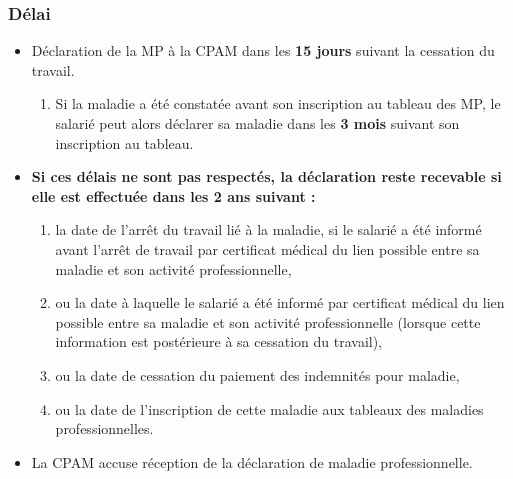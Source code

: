 \documentclass{beamer}
\begin{document}
\begin{frame}
\frametitle{Délai}

\begin{itemize}
\item Déclaration de la MP à la CPAM dans les \textbf{15 jours} suivant la cessation du travail. 
\begin{enumerate}
\item Si la maladie a été constatée avant son inscription au tableau des MP, le salarié peut alors déclarer sa maladie dans les \textbf{3 mois} suivant son inscription au tableau.
\end{enumerate}
\item \textbf{Si ces délais ne sont pas respectés, la déclaration reste recevable si elle est effectuée dans les 2 ans suivant :}
\begin{enumerate}
\item la date de l'arrêt du travail lié à la maladie, si le salarié a été informé avant l'arrêt de travail par certificat médical du lien possible entre sa maladie et son activité professionnelle,
\item ou la date à laquelle le salarié a été informé par certificat médical du lien possible entre sa maladie et son activité professionnelle (lorsque cette information est postérieure à sa cessation du travail),
\item ou la date de cessation du paiement des indemnités pour maladie,
\item ou la date de l’inscription de cette maladie aux tableaux des maladies professionnelles.
\end{enumerate}
\item La CPAM accuse réception de la déclaration de maladie professionnelle.
\end{itemize}
\end{frame} 
\end{document}
